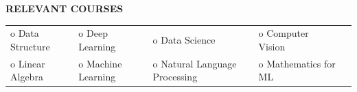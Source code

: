 \documentclass{article}
\begin{document}
\vspace{-2.7mm}




 \begin{theorem}
   \vspace{-0.7mm}
\begin{center}
\textbf{ RELEVANT COURSES
}\end{center}  
\vspace{-0.7mm}    
   \end{theorem}
\vspace{-2.5mm}

\begin{table}[htbp]

\centering
\begin{tabular}{lllll}

  o Data Structure & o Deep Learning &   o  Data Science   &  o Computer Vision  &  \\
o Linear Algebra & o Machine Learning &  o Natural Language Processing  & o Mathematics for ML
\end{tabular}
\end{table}
\vspace{-3.5mm}
\end{document}
